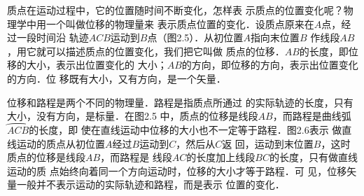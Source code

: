     质点在运动过程中，它的位置随时间不断变化，怎样表
示质点的位置变化呢？物理学中用一个叫做位移的物理量来
表示质点位置的变化．设质点原来在$A$点，经过一段时间沿
轨迹$ACB$运动到$B$点（图2.5）．从初位置$A$指向末位置$B$
作线段$AB$，用它就可以描述质点的位置变化，我们把它叫做
质点的位移．$AB$的长度，即位移的大小，表示出位置变化的
大小；$AB$的方向，即位移的方向，表示出位置变化的方向．位
移既有大小，又有方向，是一个矢量．

\begin{figure}[htp]
    \centering
    \caption{}
    \end{figure}
    
    \begin{figure}[htp]
    \centering
    \caption{}
    \end{figure}

    位移和路程是两个不同的物理量．路程是指质点所通过
的实际轨迹的长度，只有大小，没有方向，是标量．在图2.5
中，质点的位移是线段$AB$，而路程是曲线弧$\wideparen{ACB}$的长度，即
使在直线运动中位移的大小也不一定等于路程．图2.6表示
做直线运动的质点从初位置$A$经过$B$运动到$C$，然后从$C$返
回，运动到末位置$B$，这时质点的位移是线段$AB$，而路程是
线段$AC$的长度加上线段$BC$的长度，只有做直线运动的质
点始终向着同一个方向运动时，位移的大小才等于路程．可
见，位移矢量一般并不表示运动的实际轨迹和路程，而是表示
位置的变化．

